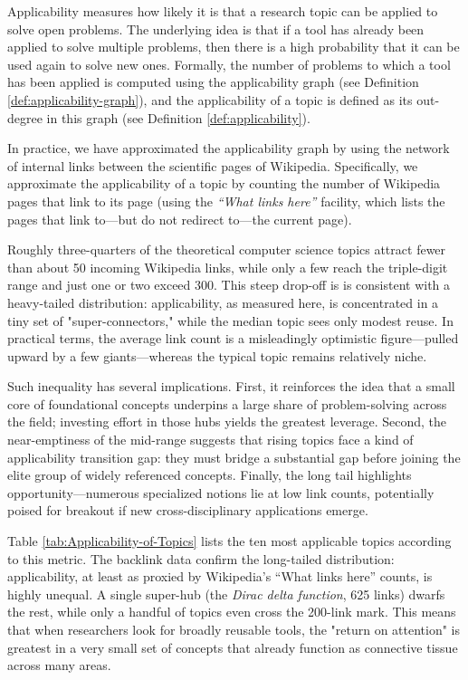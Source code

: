 Applicability measures how likely it is that a research topic can be applied to solve open problems. The underlying idea is that if a tool has already been applied to solve multiple problems, then there is a high probability that it can be used again to solve new ones. Formally, the number of problems to which a tool has been applied is computed using the applicability graph (see Definition \ref{def:applicability-graph}), and the applicability of a topic is defined as its out-degree in this graph (see Definition \ref{def:applicability}). 

In practice, we have approximated the applicability graph by using the network of internal links between the scientific pages of Wikipedia. Specifically, we approximate the applicability of a topic by counting the number of Wikipedia pages that link to its page (using the \emph{``What links here''} facility, which lists the pages that link to—but do not redirect to—the current page).

Roughly three-quarters of the theoretical computer science topics attract fewer than about 50 incoming Wikipedia links, while only a few reach the triple-digit range and just one or two exceed 300. This steep drop-off is is consistent with a heavy-tailed distribution: applicability, as measured here, is concentrated in a tiny set of "super-connectors," while the median topic sees only modest reuse. In practical terms, the average link count is a misleadingly optimistic figure—pulled upward by a few giants—whereas the typical topic remains relatively niche.

Such inequality has several implications. First, it reinforces the idea that a small core of foundational concepts underpins a large share of problem-solving across the field; investing effort in those hubs yields the greatest leverage. Second, the near-emptiness of the mid-range suggests that rising topics face a kind of applicability transition gap: they must bridge a substantial gap before joining the elite group of widely referenced concepts. Finally, the long tail highlights opportunity—numerous specialized notions lie at low link counts, potentially poised for breakout if new cross-disciplinary applications emerge.

Table \ref{tab:Applicability-of-Topics} lists the ten most applicable topics according to this metric. The backlink data confirm the long-tailed distribution: applicability, at least as proxied by Wikipedia's “What links here” counts, is highly unequal. A single super-hub (the \emph{Dirac delta function}, 625 links) dwarfs the rest, while only a handful of topics even cross the 200-link mark. This means that when researchers look for broadly reusable tools, the "return on attention" is greatest in a very small set of concepts that already function as connective tissue across many areas.

